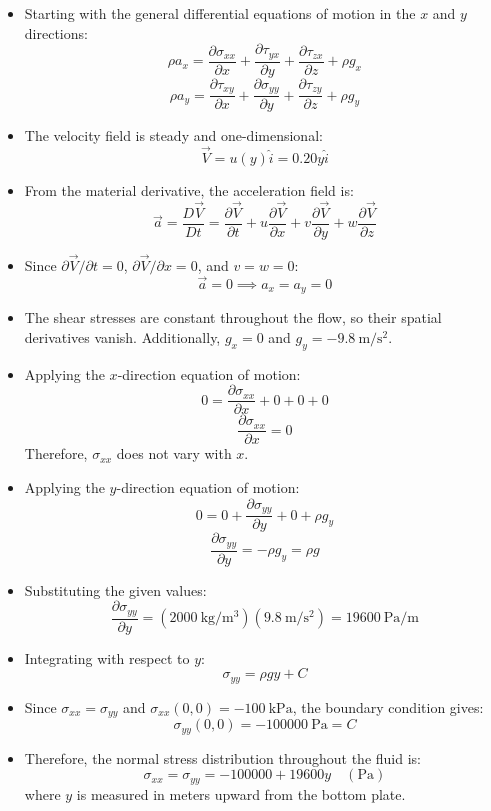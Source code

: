 ﻿\documentclass[12pt]{article}
\begin{document}
\begin{itemize}
    \item Starting with the general differential equations of motion in the $x$ and $y$ directions:
    \[\rho a_x=\frac{\partial\sigma_{xx}}{\partial x}+\frac{\partial\tau_{yx}}{\partial y}+\frac{\partial\tau_{zx}}{\partial z}+\rho g_x\]
    \[\rho a_y=\frac{\partial\tau_{xy}}{\partial x}+\frac{\partial\sigma_{yy}}{\partial y}+\frac{\partial\tau_{zy}}{\partial z}+\rho g_y\]
    \item The velocity field is steady and one-dimensional:
    \[\vec{V}=u(y)\hat{i}=0.20y\hat{i}\]
    \item From the material derivative, the acceleration field is:
    \[\vec{a}=\frac{D\vec{V}}{Dt}=\frac{\partial\vec{V}}{\partial t}+u\frac{\partial\vec{V}}{\partial x}+v\frac{\partial\vec{V}}{\partial y}+w\frac{\partial\vec{V}}{\partial z}\]
    \item Since $\partial\vec{V}/\partial t=0$, $\partial\vec{V}/\partial x=0$, and $v=w=0$:
    \[\vec{a}=0\implies a_x=a_y=0\]
    \item The shear stresses are constant throughout the flow, so their spatial derivatives vanish. Additionally, $g_x=0$ and $g_y=-\SI{9.8}{\meter\per\second\squared}$.
    \item Applying the $x$-direction equation of motion:
    \[0=\frac{\partial\sigma_{xx}}{\partial x}+0+0+0\]
    \[\frac{\partial\sigma_{xx}}{\partial x}=0\]
    Therefore, $\sigma_{xx}$ does not vary with $x$.
    \item Applying the $y$-direction equation of motion:
    \[0=0+\frac{\partial\sigma_{yy}}{\partial y}+0+\rho g_y\]
    \[\frac{\partial\sigma_{yy}}{\partial y}=-\rho g_y=\rho g\]
    \item Substituting the given values:
    \[\frac{\partial\sigma_{yy}}{\partial y}=(\SI{2000}{\kilogram\per\meter\cubed})(\SI{9.8}{\meter\per\second\squared})=\SI{19600}{\pascal\per\meter}\]
    \item Integrating with respect to $y$:
    \[\sigma_{yy}=\rho gy+C\]
    \item Since $\sigma_{xx}=\sigma_{yy}$ and $\sigma_{xx}(0,0)=-\SI{100}{\kilo\pascal}$, the boundary condition gives:
    \[\sigma_{yy}(0,0)=-\SI{100000}{\pascal}=C\]
    \item Therefore, the normal stress distribution throughout the fluid is:
    \[\boxed{\sigma_{xx}=\sigma_{yy}=-100000+19600y\quad(\si{\pascal})}\]
    where $y$ is measured in meters upward from the bottom plate.
\end{itemize}
\end{document}
